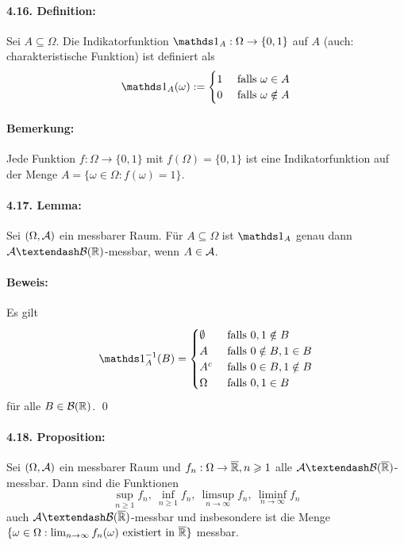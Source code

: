  \paragraph{4.16. Definition:}Sei $A\subseteq\Omega$. Die Indikatorfunktion $\ind{A}:\Omega\to\{0,1\}$ auf $A$ (auch: charakteristische Funktion) ist definiert als
 \begin{align*}
     \ind{A}(\omega):=
     \begin{cases}
         1&\text{ falls }\omega\in A \\
         0&\text{ falls }\omega\notin A
     \end{cases}
 \end{align*}
 
 \paragraph{Bemerkung:}Jede Funktion $f:\Omega\to\{0,1\}$ mit $f(\Omega)=\{0,1\}$ ist eine Indikatorfunktion auf der Menge $A=\{\omega\in\Omega:f(\omega)=1\}$.
 
 \paragraph{4.17. Lemma:}Sei $(\Omega,\mathcal{A})$ ein messbarer Raum. F\"ur $A\subseteq\Omega$ ist $\ind{A}$ genau dann $\A\textendash\borel$-messbar, wenn $A\in\mathcal{A}$.
 
 \paragraph{Beweis:}Es gilt
 \begin{align*}
     \ind{A}^{-1}(B)=
     \begin{cases}
         \emptyset&\text{ falls }0,1\notin B\\
         A&\text{ falls }0\notin B, 1\in B \\
         A^c&\text{ falls }0\in B, 1\notin B \\
         \Omega&\text{ falls }0,1\in B
     \end{cases}
 \end{align*}
 f\"ur alle $B\in\mathcal{B}(\mathbb{R})$. \qed
 
 \paragraph{4.18. Proposition:}Sei $(\Omega,\mathcal{A})$ ein messbarer Raum und $f_n:\Omega\to\overline{\mathbb{R}},n\geqslant1$ alle $\A\textendash\cB(\overline\R)$-messbar. Dann sind die Funktionen 
 $$\sup_{n\geq1}f_n,\ \inf_{n\geq1}f_n,\ \limsup_{n\to\infty}f_n,\ \liminf_{n\to\infty}f_n$$
 auch $\A\textendash\cB(\overline\R)$-messbar und insbesondere ist die Menge $\{\omega\in\Omega:\lim_{n\to\infty}f_n(\omega)\text{ existiert in }\overline{\mathbb{R}}\}$ messbar.
 
